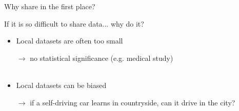 \documentclass[aspectratio=169,12pt]{beamer}
\begin{document}
\begin{frame}{Why share in the first place?}

  If it is so difficult to share data... why do it?
  \begin{itemize}
  \item Local datasets are often too small

    {\small
      $\rightarrow$ no statistical significance (e.g. medical study)
    }
    \\
    ~
    
    
  \item Local datasets can be biased

    {\small
      $\rightarrow$ if a self-driving car learns in countryside, can it drive in the city?
    }
    \\
    ~
    
        
  \end{itemize}
  
\end{frame}
\end{document}
